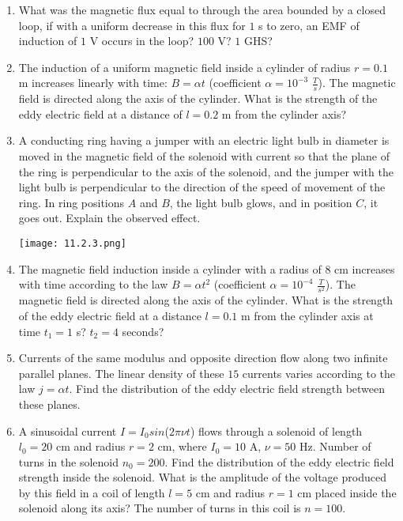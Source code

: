 \documentclass{article}
\begin{document}
\begin{enumerate}[label=11.2.\arabic*]

\item What was the magnetic flux equal to through the area bounded by a closed loop, if with a uniform decrease in this flux for $1$ s to zero, an EMF of induction of $1$ V occurs in the loop? $100$ V? $1$ GHS?

\item The induction of a uniform magnetic field inside a cylinder of radius $r = 0.1$ m increases linearly with time: $B = \alpha t$ (coefficient $\alpha = 10^{-3}$ $\frac{T}{s}$). The magnetic field is directed along the axis of the cylinder. What is the strength of the eddy electric field at a distance of $l = 0.2$ m from the cylinder axis?

\item A conducting ring having a jumper with an electric light bulb in diameter is moved in the magnetic field of the solenoid with current so that the plane of the ring is perpendicular to the axis of the solenoid, and the jumper with the light bulb is perpendicular to the direction of the speed of movement of the ring. In ring positions $A$ and $B$, the light bulb glows, and in position $C$, it goes out. Explain the observed effect.

\begin{center}
    \texttt{[image: 11.2.3.png]}
\end{center}

\item The magnetic field induction inside a cylinder with a radius of $8$ cm increases with time according to the law $B = \alpha t^2$ (coefficient $\alpha = 10^{-4}$ $\frac{T}{s^2}$). The magnetic field is directed along the axis of the cylinder. What is the strength of the eddy electric field at a distance $l = 0.1$ m from the cylinder axis at time $t_1 = 1$ s? $t_2 = 4$ seconds?

\item Currents of the same modulus and opposite direction flow along two infinite parallel planes. The linear density of these $15$ currents varies according to the law $j = \alpha t$. Find the distribution of the eddy electric field strength between these planes.

\item A sinusoidal current $I = I_0 sin$($2 \pi \nu t$) flows through a solenoid of length $l_0 = 20$ cm and radius $r = 2$ cm, where $I_0 = 10$ A, $\nu = 50$ Hz. Number of turns in the solenoid $n_0 = 200$. Find the distribution of the eddy electric field strength inside the solenoid. What is the amplitude of the voltage produced by this field in a coil of length $l = 5$ cm and radius $r = 1$ cm placed inside the solenoid along its axis? The number of turns in this coil is $n = 100$.


\end{enumerate}
\end{document}
